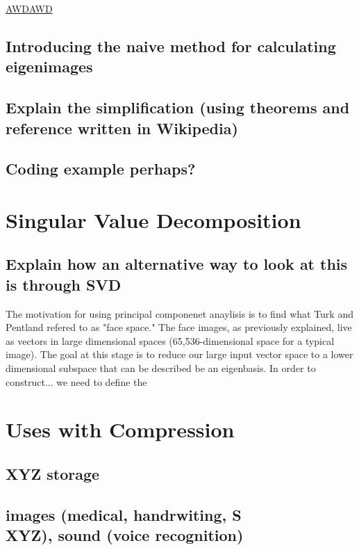 \documentclass[12pt]{extarticle}
\begin{document}
        \href{http://math.clarku.edu/\textasciitilde djoyce/ma217/covar.pdf}{AWDAWD}
    
    \subsection{Introducing the naive method for calculating eigenimages}
    \blindtext
    \subsection{Explain the simplification (using theorems and reference written in Wikipedia)}
    \blindtext
    \subsection{Coding example perhaps?}
    \blindtext
    
    \section{Singular Value Decomposition}
    \subsection{Explain how an alternative way to look at this is through SVD}
    The motivation for using principal componenet anaylisis is to find what Turk and Pentland refered to as "face space." The face images, as previously explained, live as vectors in large dimensional spaces (65,536-dimensional space for a typical image). The goal at this stage is to reduce our large input vector space to a lower dimensional subspace that can be described be an eigenbasis. 
    \newline
    \indent In order to construct... we need to define the
    
    \section{Uses with Compression}
    \subsection{XYZ storage}
    \blindtext[1]
    \subsection{images (medical, handrwiting, S\\XYZ), sound (voice recognition)}
    \blindtext[1]
    
\end{document}
